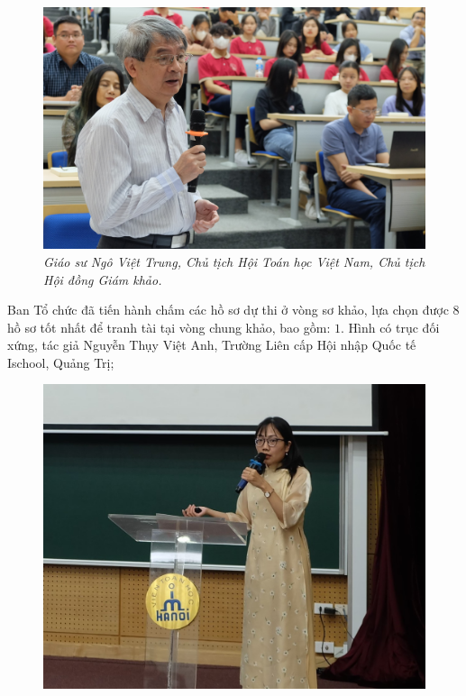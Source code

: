 \begin{multicols}{2}
\begin{figure}[H]
		\centering
		\captionsetup{labelformat= empty, justification=centering}
		\includegraphics[width= 1\linewidth]{1}
		\caption{\small\textit{\color{doisongtoanhoc}Giáo sư Ngô Việt Trung, Chủ tịch Hội Toán học Việt Nam, Chủ tịch Hội đồng Giám khảo.}}
		\vspace*{-10pt}
	\end{figure}
	Ban Tổ chức đã tiến hành chấm các hồ sơ dự thi ở vòng sơ khảo, lựa chọn được $8$ hồ sơ tốt nhất để tranh tài tại vòng chung khảo, bao gồm: 
	\vskip 0.1cm
	$1$. Hình có trục đối xứng, tác giả Nguyễn Thụy Việt Anh, Trường Liên cấp Hội nhập Quốc tế Ischool, Quảng Trị; 
	\begin{figure}[H]
		\vspace*{-5pt}
		\centering
		\captionsetup{labelformat= empty, justification=centering}
		\includegraphics[width= 1\linewidth]{2}

\end{figure}
\end{multicols}
